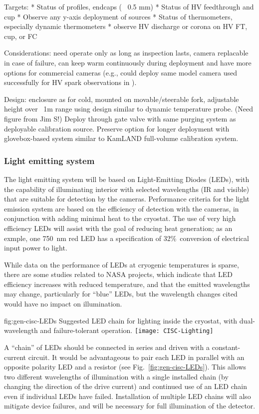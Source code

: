 Targets: * Status of profiles, endcaps (~ 0.5 mm)
* Status of HV feedthrough and cup
* Observe any y-axis deployment of sources
* Status of thermometers, especially dynamic thermometers
* observe HV discharge or corona on HV FT, cup, or FC

Considerations: need operate only as long as inspection lasts, camera
replacable in case of failure, can keep warm continuously during
deployment and have more options for commercial cameras (e.g., could
deploy same model camera used successfully for HV spark observations
in \cite{Auger:2015xlo}).

Design: enclosure as for cold, mounted on movable/steerable fork, adjustable
height over ~1m range using design similar to dynamic temperature probe.
(Need figure from Jim S!)
Deploy through
gate valve with same purging system as deployable calibration source.
Preserve option for longer deployment with glovebox-based system similar
to KamLAND full-volume calibration system.

\subsubsection{Light emitting system}
The light emitting system will be based on Light-Emitting Diodes
(LEDs), with the capability of illuminating interior with selected
wavelengths (IR and visible) that are suitable for detection by the
cameras.  Performance criteria for the light emission system are based
on the efficiency of detection with the cameras, in conjunction with
adding minimal heat to the cryostat. The use of very high efficiency
LEDs will assist with the goal of reducing heat generation; as an
exmple, one \SI{750}{nm} red LED has a specification of
32\%\ conversion of electrical input power to light.

While data on the performance of LEDs at cryogenic temperatures is sparse,
there are some studies related to NASA projects\cite{Carron:2017zzz}, which
indicate that LED efficiency increases with reduced temperature,
and that the emitted wavelengths may change, particularly for ``blue'' LEDs,
but the wavelength changes cited would have no impact on illumination.

\begin{dunefigure}{fig:gen-cisc-LEDs}
  {Suggested LED chain for lighting inside the cryostat, with
    dual-wavelength and failure-tolerant operation.}
\texttt{[image: CISC-Lighting]}
\end{dunefigure}

A ``chain'' of LEDs should be connected in series and driven with a
constant-current circuit. It would be advantageous to pair each
LED in parallel with an opposite polarity LED and a resistor
(see Fig.~\ref{fig:gen-cisc-LEDs}).
This allows two different wavelengths of illumination with a single installed
chain (by changing the direction of the drive current) and 
continued use of an LED chain even if individual LEDs have failed.
Installation of multiple LED chains will also mitigate device failures,
and will be necessary for full illumination of the detector.
